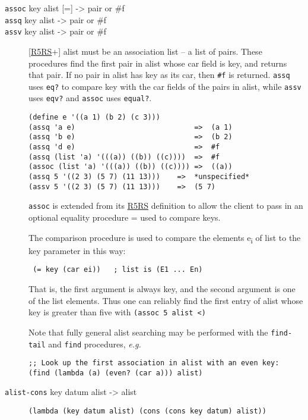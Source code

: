\begin{description}
\item[ \href{}{} \texttt{assoc} key alist {[}={]} -\textgreater{} pair
or \#f\\
\href{}{} \texttt{assq} key alist -\textgreater{} pair or \#f\\
\href{}{} \texttt{assv} key alist -\textgreater{} pair or \#f ]
{[}\protect\hyperlink{R5RS}{R5RS}+{]} alist must be an association list
-- a list of pairs. These procedures find the first pair in alist whose
car field is key, and returns that pair. If no pair in alist has key as
its car, then \texttt{\#f} is returned. \texttt{assq} uses \texttt{eq?}
to compare key with the car fields of the pairs in alist, while
\texttt{assv} uses \texttt{eqv?} and \texttt{assoc} uses
\texttt{equal?}.

\begin{verbatim}
(define e '((a 1) (b 2) (c 3)))
(assq 'a e)                            =>  (a 1)
(assq 'b e)                            =>  (b 2)
(assq 'd e)                            =>  #f
(assq (list 'a) '(((a)) ((b)) ((c))))  =>  #f
(assoc (list 'a) '(((a)) ((b)) ((c)))) =>  ((a))
(assq 5 '((2 3) (5 7) (11 13)))    =>  *unspecified*
(assv 5 '((2 3) (5 7) (11 13)))    =>  (5 7)
\end{verbatim}

\texttt{assoc} is extended from its \protect\hyperlink{R5RS}{R5RS}
definition to allow the client to pass in an optional equality procedure
= used to compare keys.

The comparison procedure is used to compare the elements
e\textsubscript{i} of list to the key parameter in this way:

\texttt{\ (=\ key\ (car\ ei))\ \ \ ;\ list\ is\ (E1\ ...\ En)}

That is, the first argument is always key, and the second argument is
one of the list elements. Thus one can reliably find the first entry of
alist whose key is greater than five with
\texttt{(assoc\ 5\ alist\ \textless{})}

Note that fully general alist searching may be performed with the
\texttt{find-tail} and \texttt{find} procedures, \emph{e.g.}

\begin{verbatim}
;; Look up the first association in alist with an even key:
(find (lambda (a) (even? (car a))) alist)
\end{verbatim}
\item[ \href{}{} \texttt{alist-cons} key datum alist -\textgreater{}
alist ]
\begin{verbatim}
(lambda (key datum alist) (cons (cons key datum) alist))
\end{verbatim}


\end{description}
